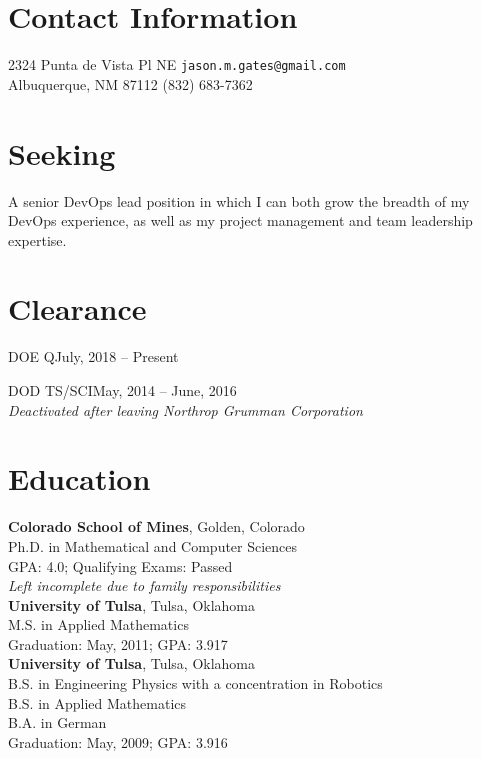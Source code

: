 \documentclass[margin,line,pifont,palatino,10pt]{res}
\begin{document}
\thispagestyle{empty}


\begin{resume}





\section{\sc Contact Information}
2324 Punta de Vista Pl NE
\hfill \texttt{\small jason.m.gates@gmail.com}\\
Albuquerque, NM 87112
\hfill (832) 683-7362






\section{\sc Seeking}
A senior DevOps lead position in which I can both grow the breadth of my DevOps experience, as well as my project management and team leadership expertise.






\vspace{1.5mm}
\section{\sc Clearance}
DOE Q\hfill July, 2018 -- Present

DOD TS/SCI\hfill May, 2014 -- June, 2016\\
\emph{Deactivated after leaving Northrop Grumman Corporation}






\vspace{1.5mm}
\section{\sc Education}
{\bf Colorado School of Mines}, Golden, Colorado\\
Ph.D. in Mathematical and Computer Sciences\\
GPA: 4.0; Qualifying Exams: Passed\\
{\em Left incomplete due to family responsibilities}\vspace{.1in}\\
{\bf University of Tulsa}, Tulsa, Oklahoma\\
M.S. in Applied Mathematics\\
Graduation: May, 2011; GPA: 3.917\vspace{.1in}\\
{\bf University of Tulsa}, Tulsa, Oklahoma\\
B.S. in Engineering Physics with a concentration in Robotics\\
B.S. in Applied Mathematics\\
B.A. in German\\
Graduation: May, 2009; GPA: 3.916







\end{resume}
\end{document}
